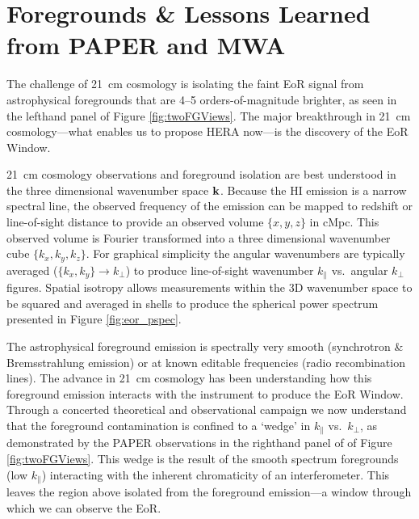 \documentclass[preprint]{aastex}
\def\kperp{k_{\bot}}
\def\kpar{k_{\|}}
\def\k{{\bf k}}
\def\HI{{H{\small I }}}
\begin{document}

\vspace{-0.25in}
\section{Foregrounds \& Lessons Learned from PAPER and MWA}
\label{LessonsSec}

The challenge of 21~cm cosmology is isolating the faint EoR signal from astrophysical foregrounds that are 4--5 orders-of-magnitude brighter, as seen in the lefthand panel of Figure \ref{fig:twoFGViews}. The major breakthrough in 21~cm cosmology---what enables us to propose HERA now---is the discovery of the EoR Window.

21~cm cosmology observations and foreground isolation are best understood in the three dimensional wavenumber space $\k$.
Because the \HI emission is a narrow spectral line, the observed frequency of the emission can be mapped to redshift or line-of-sight distance to provide an observed volume $\{x,y,z\}$ in cMpc. This observed volume is Fourier transformed into a three dimensional wavenumber cube $\{k_{x}, k_{y}, k_{z}\}$. For graphical simplicity the angular wavenumbers are typically averaged ($\{k_{x},k_{y}\}\rightarrow\kperp$) to produce line-of-sight wavenumber $\kpar$ vs.\ angular $\kperp$ figures. %
Spatial isotropy allows measurements within the 3D wavenumber space to be squared and averaged in shells to produce the spherical power spectrum presented in Figure \ref{fig:eor_pspec}.

The astrophysical foreground emission is spectrally very smooth (synchrotron \& Bremsstrahlung emission) or at known editable frequencies (radio recombination lines). The advance in 21~cm cosmology has been understanding how this foreground emission interacts with the instrument to produce the EoR Window. Through a concerted theoretical and observational campaign \citep{morales_et_al2012,parsons_et_al2012b,vedantham_2012,trott_2012,hazelton_et_al2013,pober_et_al2013,parsons_et_al2013,dillon_et_al2013b} we now understand that the foreground contamination is confined to a `wedge' in $\kpar$ vs.\ $\kperp$, as demonstrated by the PAPER observations in the righthand panel of of Figure \ref{fig:twoFGViews}. This wedge is the result of the smooth spectrum foregrounds (low $\kpar$) interacting with the inherent chromaticity of an interferometer. This leaves the region above isolated from the foreground emission---a window through which we can observe the EoR.
\end{document}
